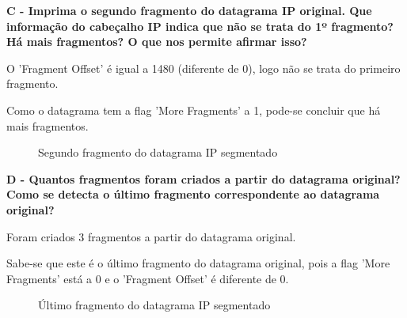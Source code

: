 \documentclass[11pt]{article}
\begin{document}
\clearpage

\textbf{C - Imprima o segundo fragmento do datagrama IP original. Que informação do cabeçalho IP indica que não se trata do 1º fragmento? Há mais fragmentos? O que nos permite afirmar isso?}

O 'Fragment Offset' é igual a 1480 (diferente de 0), logo não se trata do primeiro fragmento.

Como o datagrama tem a flag 'More Fragments' a 1, pode-se concluir que há mais fragmentos.

\begin{figure}[hbt!]
    \centering
    \caption{Segundo fragmento do datagrama IP segmentado}
\end{figure}

\vspace{0.4cm}

\textbf{D - Quantos fragmentos foram criados a partir do datagrama original? Como se detecta o último fragmento correspondente ao datagrama original?}

Foram criados 3 fragmentos a partir do datagrama original.

Sabe-se que este é o último fragmento do datagrama original, pois a flag 'More Fragments' está a 0 e o 'Fragment Offset' é diferente de 0.

\begin{figure}[hbt!]
    \centering
    \caption{Último fragmento do datagrama IP segmentado}
\end{figure}
\end{document}

